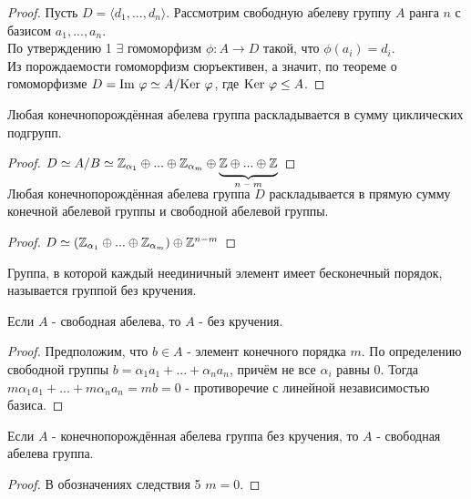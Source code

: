 \begin{proof}
    Пусть $D = \langle d_1,...,d_n \rangle$. Рассмотрим свободную абелеву группу $A$ ранга $n$ с базисом $a_1,...,a_n$. \\
    По утверждению 1 $\exists$ гомоморфизм $\phi: A \rightarrow D$ такой, что $\phi(a_i) = d_i$.\\
    Из порождаемости гомоморфизм сюръективен, а значит, по теореме о гомоморфизме $D = \textup{Im }\phi \simeq A/\textup{Ker }\phi$, где $\textup{Ker }\phi \leq A$. 
\end{proof}
\begin{consequensenum}
    Любая конечнопорождённая абелева группа раскладывается в сумму циклических подгрупп.
\end{consequensenum}
\begin{proof}
    $D \simeq A/B \simeq \Z_{\alpha_1} \oplus ... \oplus \Z_{\alpha_m} \oplus \undermat{n-m}{\Z\oplus ... \oplus \Z}\\$
\end{proof}
\begin{consequensenum}
    Любая конечнопорождённая абелева группа $D$ раскладывается в прямую сумму конечной абелевой группы и свободной абелевой группы. 
\end{consequensenum}
\begin{proof}
    $D \simeq (\Z_{\alpha_1} \oplus ... \oplus \Z_{\alpha_m}) \oplus \Z^{n-m}$
\end{proof}
\begin{definition}
    Группа, в которой каждый неединичный элемент имеет бесконечный порядок, называется группой без кручения.
\end{definition}
\begin{exercise}
    Если $A$ - свободная абелева, то $A$ - без кручения.
\end{exercise}
\begin{proof}
    Предположим, что $b \in A$ - элемент конечного порядка $m$. По определению свободной группы $b = \alpha_1a_1 + ... + \alpha_na_n$, причём не все $\alpha_i$ равны 0. Тогда $m\alpha_1a_1 + ... + m\alpha_na_n = mb = 0$ - противоречие с линейной независимостью базиса.
\end{proof}
\begin{consequensenum}
    Если $A$ - конечнопорождённая абелева группа без кручения, то $A$ - свободная абелева группа.
\end{consequensenum}
\begin{proof}
    В обозначениях следствия 5 $m = 0$.
\end{proof}
